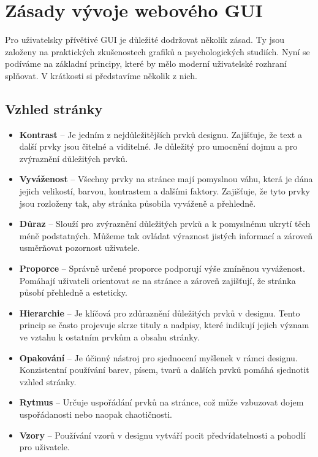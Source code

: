 \section{Zásady vývoje webového GUI}
\label{sec:principles}

Pro uživatelsky přívětivé GUI je důležité dodržovat několik zásad. Ty jsou založeny na praktických zkušenostech grafiků a psychologických studiích. Nyní se podíváme na základní principy, které by mělo moderní uživatelské rozhraní splňovat. V krátkosti si představíme několik z nich.

\subsection{Vzhled stránky}
\label{subsec:visual-principles}

\begin{itemize}
  \item \textbf{Kontrast} -- Je jedním z nejdůležitějších prvků designu. Zajišťuje, že text a další prvky jsou čitelné a viditelné. Je důležitý pro umocnění dojmu a pro zvýraznění důležitých prvků.
  \item \textbf{Vyváženost} -- Všechny prvky na stránce mají pomyslnou váhu, která je dána jejich velikostí, barvou, kontrastem a dalšími faktory. Zajišťuje, že tyto prvky jsou rozloženy tak, aby stránka působila vyváženě a přehledně.
  \item \textbf{Důraz} -- Slouží pro zvýraznění důležitých prvků a k pomyslnému ukrytí těch méně podstatných. Můžeme tak ovládat výraznost jistých informací a zároveň usměrňovat pozornost uživatele.
  \item \textbf{Proporce} -- Správně určené proporce podporují výše zmíněnou vyváženost. Pomáhají uživateli orientovat se na stránce a zároveň zajišťují, že stránka působí přehledně a esteticky.
  \item \textbf{Hierarchie} -- Je klíčová pro zdůraznění důležitých prvků v designu. Tento princip se často projevuje skrze tituly a nadpisy, které indikují jejich význam ve vztahu k ostatním prvkům a obsahu stránky.
  \item \textbf{Opakování} -- Je účinný nástroj pro sjednocení myšlenek v rámci designu. Konzistentní používání barev, písem, tvarů a dalších prvků pomáhá sjednotit vzhled stránky.
  \item \textbf{Rytmus} -- Určuje uspořádání prvků na stránce, což může vzbuzovat dojem uspořádanosti nebo naopak chaotičnosti.
  \item \textbf{Vzory} -- Používání vzorů v designu vytváří pocit předvídatelnosti a pohodlí pro uživatele.

\end{itemize}
